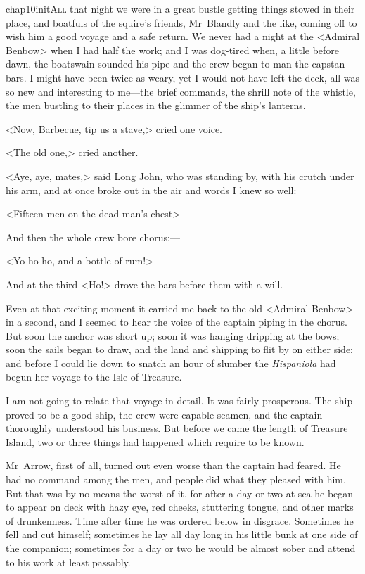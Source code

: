  
\lettrine{chap10initA}{ll} that night we were in a great bustle getting things stowed in their place, and boatfuls of the squire's friends, Mr~Bland\-ly and the like, coming off to wish him a good voyage and a safe return. We never had a night at the <Admiral Benbow> when I had half the work; and I was dog-tired when, a little before dawn, the boatswain sounded his pipe and the crew began to man the capstan-bars. I might have been twice as weary, yet I would not have left the deck, all was so new and interesting to me—the brief commands, the shrill note of the whistle, the men bustling to their places in the glimmer of the ship's lanterns.

<Now, Barbecue, tip us a stave,> cried one voice.

<The old one,> cried another.

<Aye, aye, mates,> said Long John, who was standing by, with his crutch under his arm, and at once broke out in the air and words I knew so well:

<Fifteen men on the dead man's chest\longdash>

And then the whole crew bore chorus:—

<Yo-ho-ho, and a bottle of rum!>

And at the third <Ho!> drove the bars before them with a will.

Even at that exciting moment it carried me back to the old <Admiral Benbow> in a second, and I seemed to hear the voice of the captain piping in the chorus. But soon the anchor was short up; soon it was hanging dripping at the bows; soon the sails began to draw, and the land and shipping to flit by on either side; and before I could lie down to snatch an hour of slumber the \textit{Hispaniola} had begun her voyage to the Isle of Treasure.

I am not going to relate that voyage in detail. It was fairly prosperous. The ship proved to be a good ship, the crew were capable seamen, and the captain thoroughly understood his business. But before we came the length of Treasure Island, two or three things had happened which require to be known.

Mr~Arrow, first of all, turned out even worse than the captain had feared. He had no command among the men, and people did what they pleased with him. But that was by no means the worst of it, for after a day or two at sea he began to appear on deck with hazy eye, red cheeks, stuttering tongue, and other marks of drunkenness. Time after time he was ordered below in disgrace. Sometimes he fell and cut himself; sometimes he lay all day long in his little bunk at one side of the companion; sometimes for a day or two he would be almost sober and attend to his work at least passably.

